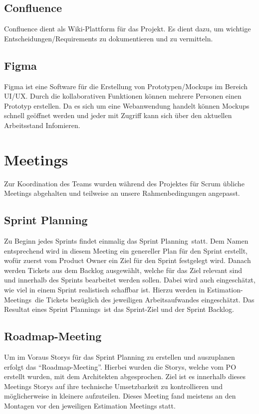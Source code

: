 \subsection{Confluence}
    Confluence dient als Wiki-Plattform für das Projekt. Es dient dazu, um wichtige Entscheidungen/Requirements zu dokumentieren und zu vermitteln.
\subsection{Figma}
    Figma ist eine Software für die Erstellung von Prototypen/Mockups im Bereich UI/UX. Durch die kollaborativen Funktionen können mehrere Personen einen Prototyp erstellen.
    Da es sich um eine Webanwendung handelt können Mockups schnell geöffnet werden und jeder mit Zugriff kann sich über den aktuellen Arbeitsstand Infomieren.

\section{Meetings}
Zur Koordination des Teams wurden während des Projektes für Scrum übliche Meetings abgehalten und teilweise an unsere Rahmenbedingungen angepasst.

\subsection{Sprint Planning}
Zu Beginn jedes Sprints findet einmalig das \glqq Sprint Planning\grqq~statt. Dem Namen entsprechend wird in diesem Meeting ein genereller Plan 
für den Sprint erstellt, wofür zuerst vom Product Owner ein Ziel für den Sprint festgelegt wird. Danach werden Tickets aus dem Backlog 
ausgewählt, welche für das Ziel relevant sind und innerhalb des Sprints bearbeitet werden sollen. Dabei wird auch eingeschätzt, wie viel in einem 
Sprint realistisch schaffbar ist. Hierzu werden in \glqq Estimation-Meetings\grqq~die Tickets bezüglich des jeweiligen Arbeitsaufwandes eingeschätzt.
Das Resultat eines \glqq Sprint Plannings\grqq~ist das Sprint-Ziel und der Sprint Backlog.

\subsection{Roadmap-Meeting}
Um im Voraus Storys für das Sprint Planning zu erstellen und auszuplanen erfolgt das \enquote{Roadmap-Meeting}.
Hierbei wurden die Storys, welche vom PO erstellt wurden, mit dem Architekten abgesprochen.
Ziel ist es innerhalb dieses Meetings Storys auf ihre technische Umsetzbarkeit zu kontrollieren und möglicherweise in kleinere aufzuteilen.
Dieses Meeting fand meistens an den Montagen vor den jeweiligen Estimation Meetings statt.

